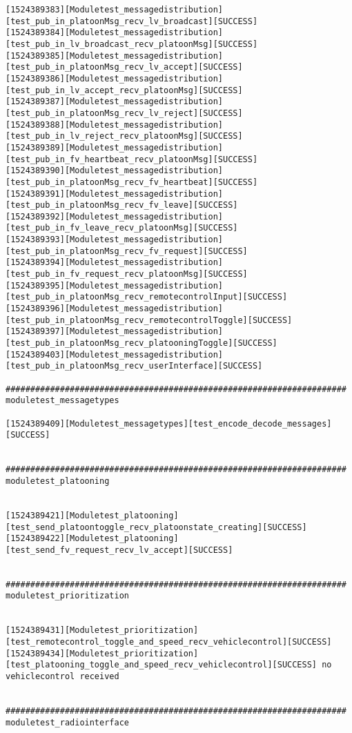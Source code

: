\documentclass[a4paper, 12pt, titlepage]{scrartcl}
\begin{document}
{\begin{lstlisting}[basicstyle=\tiny]
[1524389383][Moduletest_messagedistribution][test_pub_in_platoonMsg_recv_lv_broadcast][SUCCESS]
[1524389384][Moduletest_messagedistribution][test_pub_in_lv_broadcast_recv_platoonMsg][SUCCESS]
[1524389385][Moduletest_messagedistribution][test_pub_in_platoonMsg_recv_lv_accept][SUCCESS]
[1524389386][Moduletest_messagedistribution][test_pub_in_lv_accept_recv_platoonMsg][SUCCESS]
[1524389387][Moduletest_messagedistribution][test_pub_in_platoonMsg_recv_lv_reject][SUCCESS]
[1524389388][Moduletest_messagedistribution][test_pub_in_lv_reject_recv_platoonMsg][SUCCESS]
[1524389389][Moduletest_messagedistribution][test_pub_in_fv_heartbeat_recv_platoonMsg][SUCCESS]
[1524389390][Moduletest_messagedistribution][test_pub_in_platoonMsg_recv_fv_heartbeat][SUCCESS]
[1524389391][Moduletest_messagedistribution][test_pub_in_platoonMsg_recv_fv_leave][SUCCESS]
[1524389392][Moduletest_messagedistribution][test_pub_in_fv_leave_recv_platoonMsg][SUCCESS]
[1524389393][Moduletest_messagedistribution][test_pub_in_platoonMsg_recv_fv_request][SUCCESS]
[1524389394][Moduletest_messagedistribution][test_pub_in_fv_request_recv_platoonMsg][SUCCESS]
[1524389395][Moduletest_messagedistribution][test_pub_in_platoonMsg_recv_remotecontrolInput][SUCCESS]
[1524389396][Moduletest_messagedistribution][test_pub_in_platoonMsg_recv_remotecontrolToggle][SUCCESS]
[1524389397][Moduletest_messagedistribution][test_pub_in_platoonMsg_recv_platooningToggle][SUCCESS]
[1524389403][Moduletest_messagedistribution][test_pub_in_platoonMsg_recv_userInterface][SUCCESS]

#####################################################################
moduletest_messagetypes

[1524389409][Moduletest_messagetypes][test_encode_decode_messages][SUCCESS]


#####################################################################
moduletest_platooning


[1524389421][Moduletest_platooning][test_send_platoontoggle_recv_platoonstate_creating][SUCCESS]
[1524389422][Moduletest_platooning][test_send_fv_request_recv_lv_accept][SUCCESS]


#####################################################################
moduletest_prioritization


[1524389431][Moduletest_prioritization][test_remotecontrol_toggle_and_speed_recv_vehiclecontrol][SUCCESS]
[1524389434][Moduletest_prioritization][test_platooning_toggle_and_speed_recv_vehiclecontrol][SUCCESS] no vehiclecontrol received


#####################################################################
moduletest_radiointerface



\end{lstlisting}}
\end{document}
